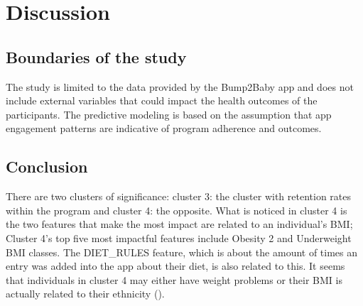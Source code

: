 \documentclass[12pt]{article}
\begin{document}




		\section{Discussion}
		
		\label{s.discuss}
		
		\subsection{Boundaries of the study}
		
		The study is limited to the data provided by the Bump2Baby app and does not include external variables that could impact the health outcomes of the participants. The predictive modeling is based on the assumption that app engagement patterns are indicative of program adherence and outcomes.
		
		\subsection{Conclusion}
		
		There are two clusters of significance: cluster 3: the cluster with retention rates within the program and cluster 4: the opposite. What is noticed in cluster 4 is the two features that make the most impact are related to an individual's BMI; Cluster 4's top five most impactful features include Obesity 2 and Underweight BMI classes. The DIET\_RULES feature, which is about the amount of times an entry was added into the app about their diet, is also related to this. It seems that individuals in cluster 4 may either have weight problems or their BMI is actually related to their ethnicity (\cite{kirbyj1}).
		
\end{document}
